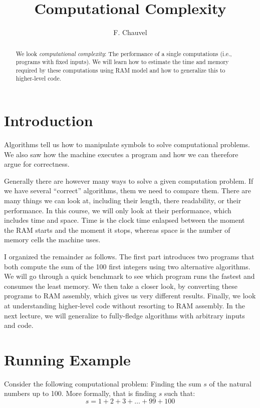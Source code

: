 \documentclass{aldast}
\title{Computational Complexity}
\author{F. Chauvel}
\begin{document}
\maketitle

\begin{abstract}
  We look \emph{computational complexity}: The performance of a single
  computations (i.e., programs with fixed inputs). We will learn how
  to estimate the time and memory required by these computations using
  RAM model and how to generalize this to higher-level code.
\end{abstract}


\section*{Introduction}

Algorithms tell us how to manipulate symbols to solve computational
problems. We also saw how the machine executes a program and how we
can therefore argue for correctness.

Generally there are however many ways to solve a given computation
problem. If we have several ``correct'' algorithms, them we need to
compare them. There are many things we can look at, including their
length, there readability, or their performance. In this course, we
will only look at their performance, which includes time and
space. Time is the clock time enlapsed between the moment the RAM
starts and the moment it stops, whereas space is the number of memory
cells the machine uses.

I organized the remainder as follows. The first part introduces two
programs that both compute the sum of the 100 first integers using two
alternative algorithms. We will go through a quick benchmark to see
which program runs the fastest and consumes the least memory. We then
take a closer look, by converting these programs to RAM assembly, which
gives us very different results. Finally, we look at understanding
higher-level code without resorting to RAM assembly. In the next
lecture, we will generalize to fully-fledge algorithms with
arbitrary inputs and code.


\section{Running Example}

Consider the following computational problem: Finding the sum $s$ of
the natural numbers up to 100. More formally, that is finding $s$
such that:
\begin{equation}
  s = 1 + 2 + 3 + \ldots + 99 + 100
\end{equation}
\end{document}
